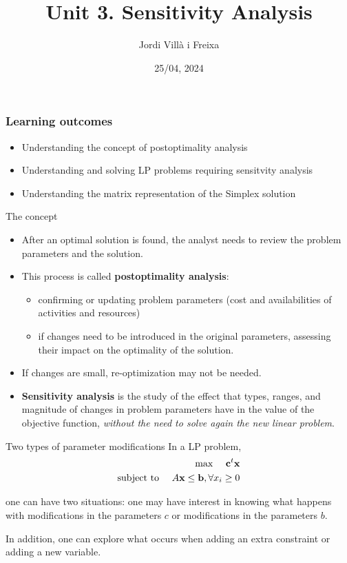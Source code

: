 \documentclass[c]{beamer}
\title[Introduction]{Unit 3. Sensitivity Analysis}
\author{Jordi Villà i Freixa}
\institute[FCTE]{
Universitat de Vic - Universitat Central de Catalunya \\
Study Abroad. Operations Research\\
\medskip
\textit{jordi.villa@uvic.cat}
}
\date{25/04, 2024}
\begin{document}
\begin{frame}
\titlepage
\end{frame}




\begin{frame}
\frametitle{Learning outcomes}
\begin{itemize}
  \item Understanding the concept of postoptimality analysis
  \item Understanding and solving LP problems requiring sensitvity analysis
  \item Understanding the matrix representation of the Simplex solution
\end{itemize}
\end{frame}

\begin{frame}{The concept}
\begin{itemize}
  \item After an optimal solution is found, the analyst needs to review the problem parameters and the solution.
  \item This process is called {\bf postoptimality analysis}:
  \begin{itemize}
    \item confirming or updating problem parameters (cost and availabilities of activities and resources)
    \item if changes need to be introduced in the original parameters, assessing their impact on the optimality of the solution.
  \end{itemize}
  \item If changes are small, re-optimization may not be needed.
  \item {\bf Sensitivity analysis} is the study of the effect that types, ranges, and magnitude of changes in problem parameters have in the value of the objective function, {\em without the need to solve again the new linear problem}.
\end{itemize}
\end{frame}

\begin{frame}{Two types of parameter modifications}
  In a LP problem, 
\begin{eqnarray*}
 \text{max }\quad\textbf{c}^t \textbf{x}\\
 \text{subject to }\quad A\textbf{x}\leq \textbf{b}, \forall x_i\geq0
\end{eqnarray*}

one can have two situations: one may have interest in knowing what happens with modifications in the parameters $c$ or modifications in the parameters $b$.

In addition, one can explore what occurs when adding an extra constraint or adding a new variable.

\end{frame}
\end{document}
